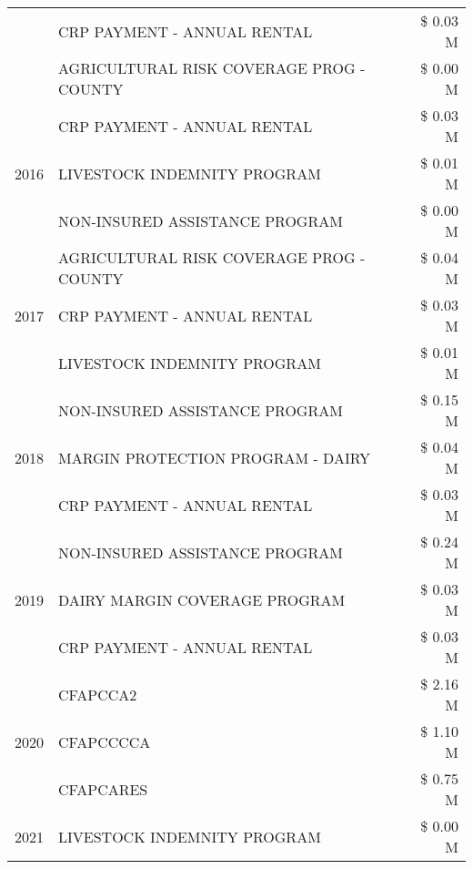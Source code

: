 \begin{tabular}{llr}
 & CRP PAYMENT - ANNUAL RENTAL & \$ 0.03 M \\
 & AGRICULTURAL RISK COVERAGE PROG - COUNTY & \$ 0.00 M \\
\cline{1-3}
\multirow[t]{3}{*}{2016} & CRP PAYMENT - ANNUAL RENTAL & \$ 0.03 M \\
 & LIVESTOCK INDEMNITY PROGRAM & \$ 0.01 M \\
 & NON-INSURED ASSISTANCE PROGRAM & \$ 0.00 M \\
\cline{1-3}
\multirow[t]{3}{*}{2017} & AGRICULTURAL RISK COVERAGE PROG - COUNTY & \$ 0.04 M \\
 & CRP PAYMENT - ANNUAL RENTAL & \$ 0.03 M \\
 & LIVESTOCK INDEMNITY PROGRAM & \$ 0.01 M \\
\cline{1-3}
\multirow[t]{3}{*}{2018} & NON-INSURED ASSISTANCE PROGRAM & \$ 0.15 M \\
 & MARGIN PROTECTION PROGRAM - DAIRY & \$ 0.04 M \\
 & CRP PAYMENT - ANNUAL RENTAL & \$ 0.03 M \\
\cline{1-3}
\multirow[t]{3}{*}{2019} & NON-INSURED ASSISTANCE PROGRAM & \$ 0.24 M \\
 & DAIRY MARGIN COVERAGE PROGRAM & \$ 0.03 M \\
 & CRP PAYMENT - ANNUAL RENTAL & \$ 0.03 M \\
\cline{1-3}
\multirow[t]{3}{*}{2020} & CFAPCCA2 & \$ 2.16 M \\
 & CFAPCCCCA & \$ 1.10 M \\
 & CFAPCARES & \$ 0.75 M \\
\cline{1-3}
2021 & LIVESTOCK INDEMNITY PROGRAM & \$ 0.00 M \\
\cline{1-3}
\bottomrule
\end{tabular}
